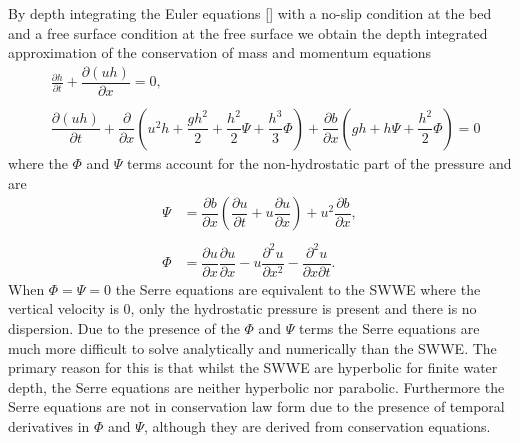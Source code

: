 By depth integrating the Euler equations [] with a no-slip condition at the bed and a free surface condition at the free surface we obtain the depth integrated approximation of the conservation of mass and momentum equations
\begin{subequations}
	\begin{align}
	&\frac{\partial h}{\partial t} + \dfrac{\partial (uh)}{\partial x} = 0,  \label{eqn:FullSerreNonConMass} \\ \nonumber \\
	&\dfrac{\partial (uh)}{\partial t} + \dfrac{\partial}{\partial x} \left ( u^2h + \dfrac{gh^2}{2} + \dfrac{h^2}{2}{\Psi} + \dfrac{h^3}{3}{ \Phi }  \right )  +  \dfrac{\partial b}{\partial x} \left (gh +   h \Psi + \dfrac{h^2}{2}{ \Phi }  \right ) = 0	\label{eqn:FullSerreNonConMome}
	\end{align}
	\label{eqn:FullSerreNonCon}
\end{subequations}
where the $\Phi$ and $\Psi$ terms account for the non-hydrostatic part of the pressure and are
	\begin{subequations}
	\begin{align}
	{ \Psi }  &= \dfrac{\partial b}{\partial x}\left(\dfrac{\partial u}{\partial t} + u\dfrac{\partial u}{\partial x} \right)  + u^2\dfrac{\partial b}{\partial x}, \label{eqn:SerreeqnPsi} \\ \nonumber \\
 { \Phi }  &= \dfrac{\partial u }{\partial x} \dfrac{\partial u}{\partial x} -u \dfrac{\partial^2 u}{\partial x^2}  - \dfrac{\partial^2 u}{\partial x \partial t} . \label{eqn:SerreeqnPhi} 
	\end{align}
	\label{eqn:FullSerreNonConVarDef}
	\end{subequations}
When $\Phi = \Psi = 0$ the Serre equations are equivalent to the SWWE where the vertical velocity is $0$, only the hydrostatic pressure is present and there is no dispersion. Due to the presence of the $\Phi$ and $\Psi$ terms the Serre equations are much more difficult to solve analytically and numerically than the SWWE. The primary reason for this is that whilst the SWWE are hyperbolic for finite water depth, the Serre equations are neither hyperbolic nor parabolic. Furthermore the Serre equations are not in conservation law form due to the presence of temporal derivatives in $\Phi$ and $\Psi$, although they are derived from conservation equations. 

